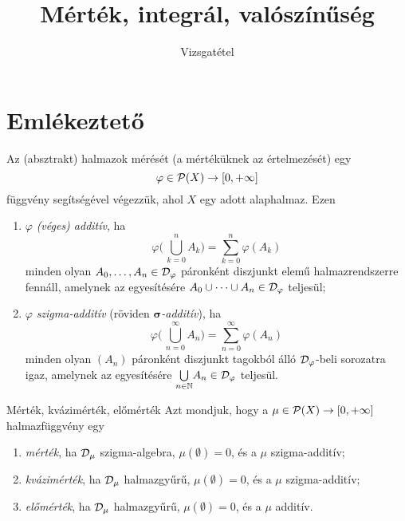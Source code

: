 \documentclass[
]{elteikthesis}[2024/04/26]
\title{Mérték, integrál, valószínűség} %
\subtitle{\circled{6} Vizsgatétel}
\begin{document}
	
	
	\section{Emlékeztető}
	
	Az (absztrakt) halmazok mérését (a mértéküknek az értelmezését) egy
	\[
		\varphi \in \mathcal{P}( X ) \to [0, +\infty]
	\]
	függvény segítségével végezzük, ahol \( X \) egy adott alaphalmaz. Ezen
	\begin{enumerate}
		\item \( \varphi \) \emph{(véges) additív}, ha
		\[
			\varphi \Biggl(\, \bigcup_{k=0}^n A_k \Biggr) = \sum_{k=0}^n \varphi(A_k)
		\]
		minden olyan \( A_0, \dots, A_n \in \mathcal{D}_{\varphi} \) páronként diszjunkt elemű halmazrendszerre fennáll, amelynek az egyesítésére
		\( A_0 \cup \cdots \cup A_n \in \mathcal{D}_{\varphi} \) teljesül;
		
		\item \( \varphi \) \emph{szigma-additív} 
		(röviden \emph{\( \boldsymbol{\sigma} \)-additív}), ha
		\[
			\varphi \Biggl(\, \bigcup_{n=0}^\infty A_n \Biggr) = 
			\sum_{n=0}^\infty \varphi(A_n)
		\]
		minden olyan \( (A_n) \) páronként diszjunkt tagokból álló 
		\( \mathcal{D}_{\varphi} \)-beli sorozatra igaz, amelynek az egyesítésére 
		\( \bigcup\limits_{n \in \mathbb{N}} \! A_n \in \mathcal{D}_{\varphi} \) teljesül.
	\end{enumerate}
	
	\begin{definition}{Mérték, kvázimérték, előmérték}{}
		Azt mondjuk, hogy a \( \mu \in \mathcal{P}( X ) \to [0, +\infty] \) halmazfüggvény egy
		\begin{enumerate}
			\item \emph{mérték}, ha \( \mathcal{D}_{\mu} \) szigma-algebra, \( \mu(\emptyset) = 0 \), és a \( \mu \) szigma-additív;
			
			\item \emph{kvázimérték}, ha \( \mathcal{D}_{\mu} \) halmazgyűrű, 
			\( \mu(\emptyset) = 0 \), és a \( \mu \) szigma-additív;
			
			\item \emph{előmérték}, ha \( \mathcal{D}_{\mu} \) halmazgyűrű, 
			\( \mu(\emptyset) = 0 \), és a \( \mu \) additív.
		\end{enumerate}
	\end{definition}
	
\end{document}
